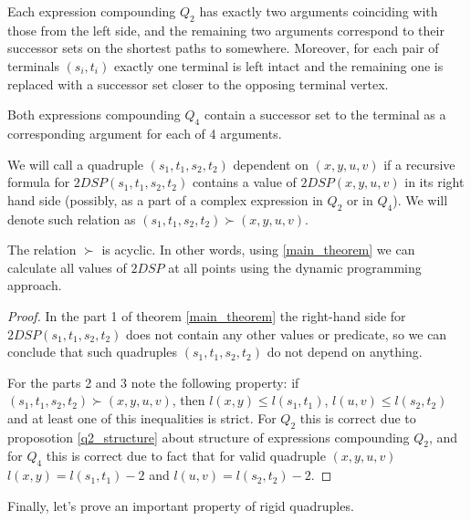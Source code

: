 \begin{proposition} \label{q2_structure}
Each expression compounding $Q_2$ has exactly two arguments coinciding with those from the left side, and the remaining two arguments correspond to their successor sets on the shortest paths to somewhere. Moreover, for each pair of terminals $(s_i, t_i)$ exactly one terminal is left intact and the remaining one is replaced with a successor set closer to the opposing terminal vertex.
\end{proposition}

\begin{proposition}
Both expressions compounding $Q_4$ contain a successor set to the terminal as a corresponding argument for each of 4 arguments.
\end{proposition}

We will call a quadruple $(s_1, t_1, s_2, t_2)$ dependent on $(x, y, u, v)$ if a recursive formula for $2DSP(s_1, t_1, s_2, t_2)$ contains a value of $2DSP(x, y, u, v)$ in its right hand side (possibly, as a part of a complex expression in $Q_2$ or in $Q_4$). We will denote such relation as $(s_1, t_1, s_2, t_2) \succ (x, y, u, v)$.

\begin{proposition}
The relation $\succ$ is acyclic. In other words, using \ref{main_theorem} we can calculate all values of $2DSP$ at all points using the dynamic programming approach.
\end{proposition}
\begin{proof}
In the part 1 of theorem \ref{main_theorem} the right-hand side for $2DSP(s_1, t_1, s_2, t_2)$ does not contain any other values or predicate, so we can conclude that such quadruples $(s_1, t_1, s_2, t_2)$ do not depend on anything.

For the parts 2 and 3 note the following property: if $(s_1, t_1, s_2, t_2) \succ (x, y, u, v)$, then $l(x, y) \leq l(s_1, t_1)$, $l(u, v) \leq l(s_2, t_2)$ and at least one of this inequalities is strict. For $Q_2$ this is correct due to proposotion \ref{q2_structure} about structure of expressions compounding $Q_2$, and for $Q_4$ this is correct due to fact that for valid quadruple $(x, y, u, v)$ $l(x, y) = l(s_1, t_1) - 2$ and $l(u, v) = l(s_2, t_2) - 2$.
\end{proof}

Finally, let's prove an important property of rigid quadruples.

